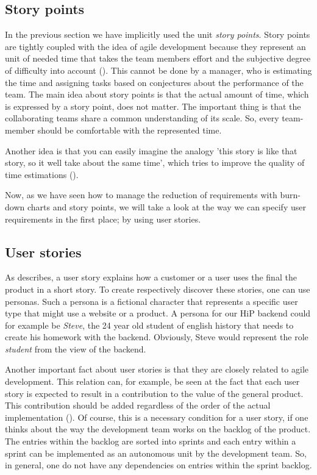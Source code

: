 \subsection{Story points}
\label{storyPoints}
In the previous section we have implicitly used the unit  \emph{story points}. Story points are tightly coupled with the idea of agile development because they represent an unit of needed time that takes the team members effort and the subjective degree of difficulty into account (\cite{ScrumMeth}). This cannot be done by a manager, who is estimating the time and assigning tasks based on conjectures about the performance of the team. The main idea about story points is that the actual amount of time, which is expressed by a story point, does not matter. The important thing is that the collaborating teams share a common understanding of its scale. So, every team-member should be comfortable with the represented time. 

Another idea is that you can easily imagine the analogy 'this story is like that story, so it well take about the same time', which tries to improve the quality of time estimations (\cite{cohn2004user}).

Now, as we have seen how to manage the reduction of requirements with burn-down charts and story points, we will take a look at the way we can specify user requirements in the first place; by using user stories.

\subsection{User stories}
As \cite{Pichler:2010aa} describes, a user story explains how a customer or a user uses the final the product in a short story. To create respectively discover these stories, one can use personas. Such a persona is a fictional character that represents a specific user type that might use a website or a product. A persona for our \ac{HiP} backend could for example be \emph{Steve}, the 24 year old student of english history that needs to create his homework with the backend. Obviously, Steve would represent the role \emph{student} from the view of the backend. 

Another important fact about user stories is that they are closely related to agile development. This relation can, for example, be seen at the fact that each user story is expected to result in a contribution to the value of the general product. This contribution should be added regardless of the order of the actual implementation (\cite{Alliance:2013aa}). Of course, this is a necessary condition for a user story, if one thinks about the way the development team works on the backlog of the product. The entries within the backlog are sorted into sprints and each entry within a sprint can be implemented as an autonomous unit by the development team. So, in general, one do not have any dependencies on entries within the sprint backlog.

